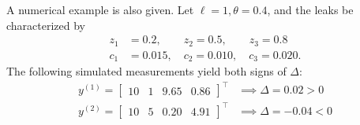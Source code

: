 A numerical example is also given. Let $\ell=1, \theta=0.4$, and the leaks be characterized by
\begin{align*}
    z_1 & =0.2, \qquad z_2 = 0.5, \qquad z_3=0.8\\
    c_1 & =0.015, \quad c_2 = 0.010, \quad c_3=0.020.
\end{align*}
The following simulated measurements yield both signs of $\Delta$:
\begin{align*}
    y^{(1)} = \begin{bmatrix}
        10 & 1 & 9.65 & 0.86
    \end{bmatrix}^\top &\implies \Delta = 0.02 > 0\\
    y^{(2)} = \begin{bmatrix}
        10 & 5 & 0.20 & 4.91
    \end{bmatrix}^\top &\implies \Delta = -0.04 < 0\\
\end{align*}

